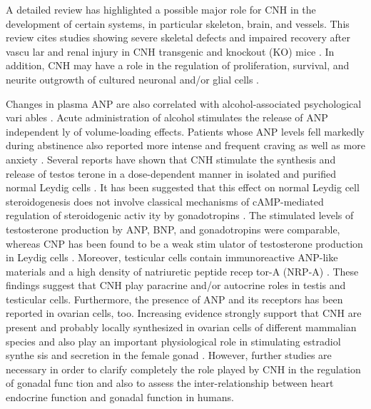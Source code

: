 \documentclass[14pt,a4paper,onecolumn]{extarticle}
\begin{document}
A  detailed review \citep{107} has highlighted a possible major role for CNH in the development of certain systems, in particular skeleton, brain, and vessels. This review cites  studies showing severe skeletal defects and impaired recovery after vascu lar and renal injury in CNH transgenic and knockout (KO) mice \citep{108}. In addition, CNH may have a role in the regulation of proliferation, survival, and neurite outgrowth of cultured neuronal and/or glial cells \citep{108}.

Changes in plasma ANP are also correlated with alcohol-associated psychological vari ables \citep{108}. Acute administration of alcohol stimulates the release of ANP independent ly of volume-loading effects. Patients whose ANP levels fell markedly during abstinence also reported more intense and frequent craving as well as more anxiety \citep{108}.  Several reports have shown that CNH stimulate the synthesis and release of testos terone in a dose-dependent manner in isolated and purified normal Leydig cells \citep{109 112}. It has been suggested that this effect on normal Leydig cell steroidogenesis does not involve classical mechanisms of cAMP-mediated regulation of steroidogenic activ ity by gonadotropins \citep{112}. The stimulated levels of testosterone production by ANP, BNP, and gonadotropins were comparable, whereas CNP has been found to be a weak stim ulator of testosterone production in Leydig cells \citep{112}. Moreover, testicular cells contain immunoreactive ANP-like materials and a high density of natriuretic peptide recep tor-A (NRP-A) \citep{112}. These findings suggest that CNH play paracrine and/or autocrine roles in testis and testicular cells. Furthermore, the presence of ANP and its receptors has been reported in ovarian cells, too. Increasing evidence strongly support that CNH are present and probably locally synthesized in ovarian cells of different mammalian species and also play an important physiological role in stimulating estradiol synthe sis and secretion in the female gonad \citep{112} \citep{113} \citep{114} \citep{115}. However, further studies are necessary in order to clarify completely the role played by CNH in the regulation of gonadal func tion and also to assess the inter-relationship between heart endocrine function and gonadal function in humans.
\end{document}
